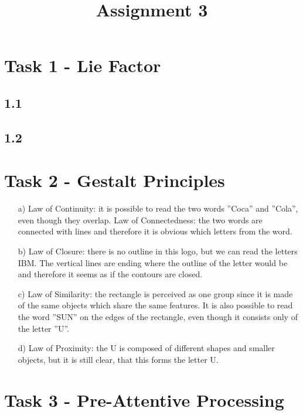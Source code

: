 \documentclass[a4paper]{article}
\date{}
\author{}
\title{\textbf{Assignment 3}}
\begin{document}
\maketitle 
\thispagestyle{fancy}

\section*{Task 1 - Lie Factor}
\subsection*{1.1}
\subsection*{1.2}
\section*{Task 2 - Gestalt Principles}

\begin{enumerate}
	\item[a)]
	Law of Continuity: it is possible to read the two words ''Coca'' and ''Cola'', even though they overlap. 
	Law of Connectedness: the two words are connected with lines and therefore it is obvious which letters from the word. 
	\item[b)]
	Law of Closure: there is no outline in this logo, but we can read the letters IBM. The vertical lines are ending where the outline of the letter would be and therefore it seems as if the contours are closed.  
	\item[c)] 
	Law of Similarity: the rectangle is perceived as one group since it is made of the same objects which share the same features. 
	It is also possible to read the word ''SUN'' on the edges of the rectangle, even though it consists only of the letter ''U''.
	\item[d)] 
	Law of Proximity: the U is composed of different shapes and smaller objects, but it is still clear, that this forms the letter U. 
\end{enumerate}

\section*{Task 3 - Pre-Attentive Processing}
	
\end{document}
